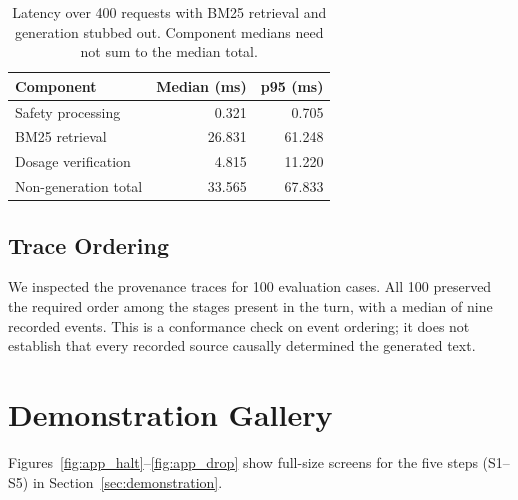 \documentclass[11pt,a4paper]{article}
\begin{document}
\begin{table}[t]
\centering
\small
\begin{tabular}{lrr}
\toprule
\textbf{Component} & \textbf{Median (ms)} & \textbf{p95 (ms)} \\
\midrule
Safety processing & 0.321 & 0.705 \\
BM25 retrieval & 26.831 & 61.248 \\
Dosage verification & 4.815 & 11.220 \\
\midrule
Non-generation total & 33.565 & 67.833 \\
\bottomrule
\end{tabular}
\caption{Latency over 400 requests with BM25 retrieval and generation stubbed out. Component medians need not sum to the median total.}
\label{tab:latency}
\end{table}

\subsection{Trace Ordering}
We inspected the provenance traces for 100 evaluation cases. All 100 preserved the required order among the stages present in the turn, with a median of nine recorded events. This is a conformance check on event ordering; it does not establish that every recorded source causally determined the generated text.

\section{Demonstration Gallery}
\label{app:ui}

Figures~\ref{fig:app_halt}--\ref{fig:app_drop} show full-size screens for the five steps (S1--S5) in Section~\ref{sec:demonstration}.
\end{document}
